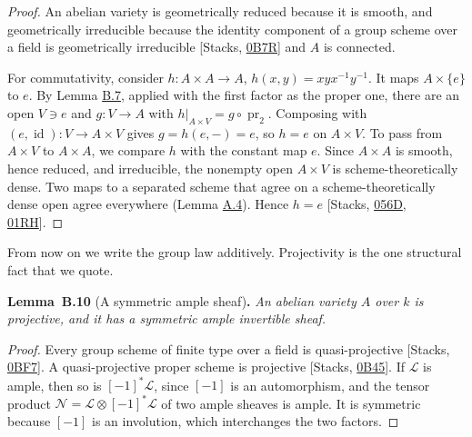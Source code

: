 \documentclass[11pt]{article}
\newenvironment{bpstatement}[2]{\par\addvspace{0.6\baselineskip}\noindent\textbf{#1}#2\textbf{.}\enspace\ignorespaces}
  {\par\addvspace{0.4\baselineskip}}
\newenvironment{bpstatementit}[2]{\begin{bpstatement}{#1}{#2}\itshape\ignorespaces}{\end{bpstatement}}
\begin{document}
\begin{proof}[{Proof}]\label{bp101}%
An abelian variety is geometrically reduced because it is smooth, and geometrically irreducible because the identity component of a group scheme over a field is geometrically irreducible [Stacks, \href{https://stacks.math.columbia.edu/tag/0B7R}{0B7R}] and \(A\) is connected.

For commutativity, consider \(h:A\times A\to A\), \(h(x,y)=xyx^{-1}y^{-1}\). It maps \(A\times\{e\}\) to \(e\). By Lemma \hyperref[bp94]{B.7}, applied with the first factor as the proper one, there are an open \(V\ni e\) and \(g:V\to A\) with \(h|_{A\times V}=g\circ\operatorname{pr}_2\). Composing with \((e,\operatorname{id}):V\to A\times V\) gives \(g=h(e,-)=e\), so \(h=e\) on \(A\times V\). To pass from \(A\times V\) to \(A\times A\), we compare \(h\) with the constant map \(e\). Since \(A\times A\) is smooth, hence reduced, and irreducible, the nonempty open \(A\times V\) is scheme-theoretically dense. Two maps to a separated scheme that agree on a scheme-theoretically dense open agree everywhere (Lemma \hyperref[bp14]{A.4}). Hence \(h=e\) [Stacks, \href{https://stacks.math.columbia.edu/tag/056D}{056D}, \href{https://stacks.math.columbia.edu/tag/01RH}{01RH}].
\end{proof}

\label{bp102}%
From now on we write the group law additively. Projectivity is the one structural fact that we quote.

\label{bp103}%
\begin{bpstatementit}{Lemma~B.10}{ (A symmetric ample sheaf)}
An abelian variety \(A\) over \(k\) is projective, and it has a symmetric ample invertible sheaf.
\end{bpstatementit}

\begin{proof}[{Proof}]\label{bp104}%
Every group scheme of finite type over a field is quasi-projective [Stacks, \href{https://stacks.math.columbia.edu/tag/0BF7}{0BF7}]. A quasi-projective proper scheme is projective [Stacks, \href{https://stacks.math.columbia.edu/tag/0B45}{0B45}]. If \(\mathcal L\) is ample, then so is \([-1]^*\mathcal L\), since \([-1]\) is an automorphism, and the tensor product \(\mathcal N=\mathcal L\otimes[-1]^*\mathcal L\) of two ample sheaves is ample. It is symmetric because \([-1]\) is an involution, which interchanges the two factors.
\end{proof}
\end{document}
